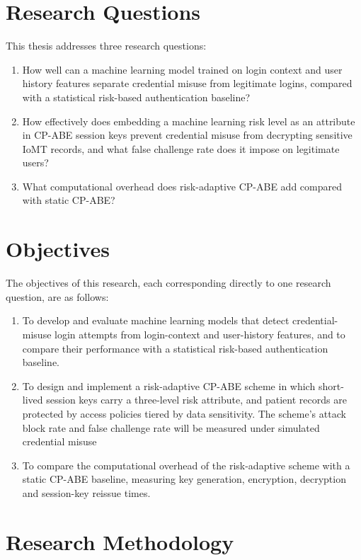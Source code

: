 \section{Research Questions}
\label{sec:researchquestions}

This thesis addresses three research questions:

\begin{enumerate}
    \item How well can a machine learning model trained on login context and user history features separate credential misuse from legitimate logins, compared with a statistical risk-based authentication baseline?
    \item How effectively does embedding a machine learning risk level as an attribute in CP-ABE session keys prevent credential misuse from decrypting sensitive IoMT records, and what false challenge rate does it impose on legitimate users?
    \item What computational overhead does risk-adaptive CP-ABE add compared with static CP-ABE?
\end{enumerate}

\section{Objectives}
\label{sec:objectives}

The objectives of this research, each corresponding directly to one research question, are as follows:

\begin{enumerate}
    \item To develop and evaluate machine learning models that detect credential-misuse login attempts from login-context and user-history features, and to compare their performance with a statistical risk-based authentication baseline.
    \item To design and implement a risk-adaptive CP-ABE scheme in which short-lived session keys carry a three-level risk attribute, and patient records are protected by access policies tiered by data sensitivity. The scheme's attack block rate and false challenge rate will be measured under simulated credential misuse
    \item To compare the computational overhead of the risk-adaptive scheme with a static CP-ABE baseline, measuring key generation, encryption, decryption and session-key reissue times.
\end{enumerate}

\section{Research Methodology}
\label{sec:researchmethodology}

